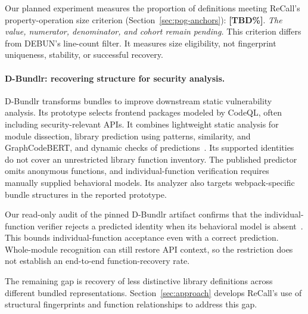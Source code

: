 Our planned experiment measures the proportion of definitions meeting ReCall's property-operation size criterion (Section~\ref{sec:pog-anchors}): \textbf{[TBD\%]}. \emph{The value, numerator, denominator, and cohort remain pending.} This criterion differs from DEBUN's line-count filter. It measures size eligibility, not fingerprint uniqueness, stability, or successful recovery.

\paragraph{D-Bundlr: recovering structure for security analysis.}
D-Bundlr transforms bundles to improve downstream static vulnerability analysis. Its prototype selects frontend packages modeled by CodeQL, often including security-relevant APIs. It combines lightweight static analysis for module dissection, library prediction using patterns, similarity, and GraphCodeBERT, and dynamic checks of predictions~\cite{xu2026dbundlr}. Its supported identities do not cover an unrestricted library function inventory. The published predictor omits anonymous functions, and individual-function verification requires manually supplied behavioral models. Its analyzer also targets webpack-specific bundle structures in the reported prototype.

Our read-only audit of the pinned D-Bundlr artifact confirms that the individual-function verifier rejects a predicted identity when its behavioral model is absent~\cite{dbundlrVerifier}. This bounds individual-function acceptance even with a correct prediction. Whole-module recognition can still restore API context, so the restriction does not establish an end-to-end function-recovery rate.

The remaining gap is recovery of less distinctive library definitions across different bundled representations. Section~\ref{sec:approach} develops ReCall's use of structural fingerprints and function relationships to address this gap.

